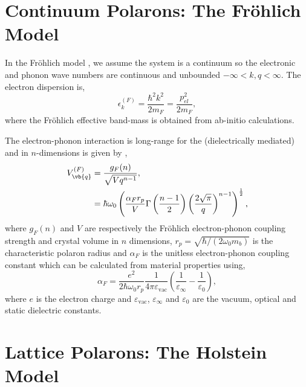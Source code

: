 \section{Continuum Polarons: The Fr\"ohlich Model}

In the Fr\"ohlich model \cite{frohlich}, we assume the system is a continuum so the electronic and phonon wave numbers are continuous and unbounded $-\infty < k, q < \infty$. The electron dispersion is,
\begin{equation}
    \epsilon_k^{(F)} = \frac{\hbar^2 k^2}{2 m_F} = \frac{p^2_{el}}{2 m_F},
\end{equation}
where the Fr\"ohlich effective band-mass is obtained from ab-initio calculations.

The electron-phonon interaction is long-range for the (dielectrically mediated) and in $n$-dimensions is given by \cite{Peeters1986},
\begin{equation}
    \begin{aligned}
        V^{(F)}_{\vb{q}} &= \frac{g_{F}(n)}{\sqrt{V q^{n-1}}}, \\
        &= \hbar \omega_0 \left(\frac{\alpha_F r_p}{V} \Gamma\left(\frac{n-1}{2}\right) \left( \frac{2 \sqrt{\pi}}{q} \right)^{n-1}\right)^{\frac{1}{2}},
    \end{aligned}
\end{equation}
where $g_{F}(n)$ and $V$ are respectively the Fr\"ohlich electron-phonon coupling strength and crystal volume in $n$ dimensions, $r_p = \sqrt{\hbar / (2 \omega_0 m_b)}$ is the characteristic polaron radius and $\alpha_F$ is the unitless electron-phonon coupling constant which can be calculated from material properties using,
\begin{equation}
    \alpha_F = \frac{e^2}{2 \hbar \omega_0 r_p} \frac{1}{4\pi \varepsilon_{\text{vac}}}\left(\frac{1}{\varepsilon_{\infty}} - \frac{1}{\varepsilon_0}\right),
\end{equation}
where $e$ is the electron charge and $\varepsilon_{\text{vac}}$, $\varepsilon_{\infty}$ and $\varepsilon_0$ are the vacuum, optical and static dielectric constants.

\section{Lattice Polarons: The Holstein Model}

